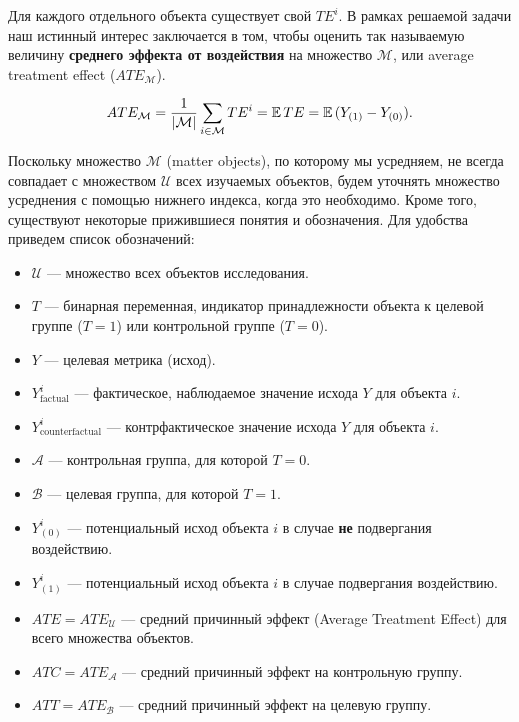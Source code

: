         Для каждого отдельного объекта существует свой $TE^i$.
        В рамках решаемой задачи наш истинный интерес заключается в том, чтобы оценить так называемую величину \textbf{среднего эффекта от воздействия} на множество $\mathcal{M}$, или average treatment effect ($ATE_\mathcal{M}$).

        \[
        ATE_{\mathcal{M}}=
        \frac{1}{|\mathcal{M}|} \displaystyle\sum_{i\in\mathcal{M}}TE^i=
        \operatorname{\mathbb{E}}{}TE=
        \operatorname{\mathbb{E}}{}(Y_{(1)}-Y_{(0)}).
        \]

        Поскольку множество $\mathcal{M}$ (matter objects), по которому мы усредняем, не всегда совпадает с множеством $\mathcal{U}$ всех изучаемых объектов, будем уточнять множество усреднения с помощью нижнего индекса, когда это необходимо.
        Кроме того, существуют некоторые прижившиеся понятия и обозначения.
        Для удобства приведем список обозначений:

        \begin{itemize}
            \item $\mathcal{U}$ --- множество всех объектов исследования.
            \item $T$ --- бинарная переменная, индикатор принадлежности объекта к целевой группе ($T=1$) или контрольной группе ($T=0$).
            \item $Y$ --- целевая метрика (исход).
            \item $Y^i_{\text{factual}}$ --- фактическое, наблюдаемое значение исхода $Y$ для объекта $i$.
            \item $Y^i_{\text{counterfactual}}$ --- контрфактическое значение исхода $Y$ для объекта $i$.
            \item $\mathcal{A}$ --- контрольная группа, для которой $T = 0$.
            \item $\mathcal{B}$ --- целевая группа, для которой $T = 1$.
            \item $Y^i_{(0)}$ --- потенциальный исход объекта $i$ в случае \textbf{не} подвергания воздействию.
            \item $Y^i_{(1)}$ --- потенциальный исход объекта $i$ в случае подвергания воздействию.
            \item $ATE = ATE_\mathcal{U}$ --- средний причинный эффект (Average Treatment Effect) для всего множества объектов.
            \item $ATC = ATE_\mathcal{A}$ --- средний причинный эффект на контрольную группу.
            \item $ATT = ATE_\mathcal{B}$ --- средний причинный эффект на целевую группу.
        \end{itemize}


